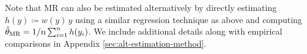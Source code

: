 


Note that MR can also be estimated alternatively by directly estimating $h(y) \coloneqq w(y)\,y$ 
using a similar regression technique as above and computing $\hat{\theta}_{\textup{MR}} = 1/n \sum_{i=1}^n h(y_i)$. We include additional details along with empirical comparisons in Appendix \ref{sec:alt-estimation-method}. 

